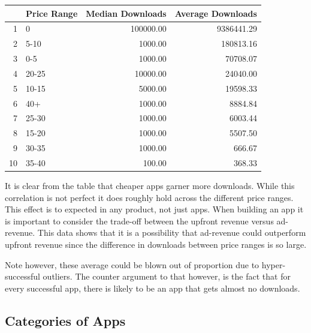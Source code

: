 \documentclass[11pt,preprint, authoryear]{elsarticle}
\let\origtable\table
\let\endorigtable\endtable
\renewenvironment{table}[1][2] {
    \expandafter\origtable\expandafter[H]
} {
    \endorigtable
}
\numberwithin{equation}{section}
\numberwithin{figure}{section}
\numberwithin{table}{section}
\begin{document}
\begin{table}[ht]
\centering
\begin{tabular}{rlrr}
  \hline
 & Price Range & Median Downloads & Average Downloads \\ 
  \hline
1 & 0 & 100000.00 & 9386441.29 \\ 
  2 & 5-10 & 1000.00 & 180813.16 \\ 
  3 & 0-5 & 1000.00 & 70708.07 \\ 
  4 & 20-25 & 10000.00 & 24040.00 \\ 
  5 & 10-15 & 5000.00 & 19598.33 \\ 
  6 & 40+ & 1000.00 & 8884.84 \\ 
  7 & 25-30 & 1000.00 & 6003.44 \\ 
  8 & 15-20 & 1000.00 & 5507.50 \\ 
  9 & 30-35 & 1000.00 & 666.67 \\ 
  10 & 35-40 & 100.00 & 368.33 \\ 
   \hline
\end{tabular}
\caption{Price vs Downloads} 
\end{table}

It is clear from the table that cheaper apps garner more downloads.
While this correlation is not perfect it does roughly hold across the
different price ranges. This effect is to expected in any product, not
just apps. When building an app it is important to consider the
trade-off between the upfront revenue versus ad-revenue. This data shows
that it is a possibility that ad-revenue could outperform upfront
revenue since the difference in downloads between price ranges is so
large.

Note however, these average could be blown out of proportion due to
hyper-successful outliers. The counter argument to that however, is the
fact that for every successful app, there is likely to be an app that
gets almost no downloads.

\hypertarget{categories-of-apps}{%
\subsection{Categories of Apps}\label{categories-of-apps}}
\end{document}
